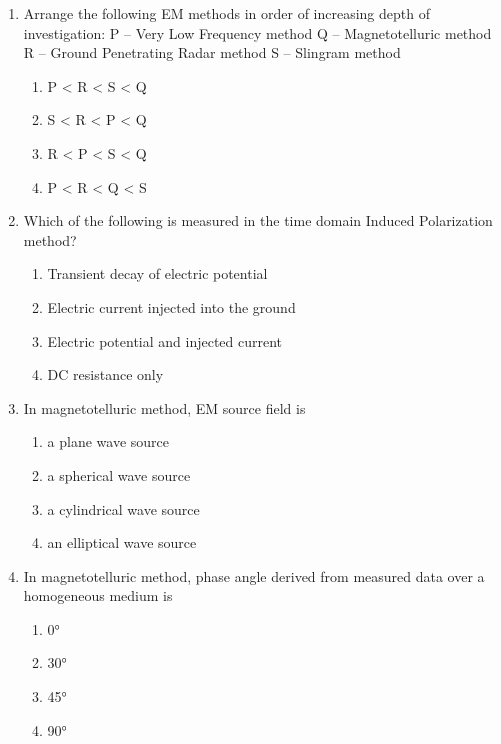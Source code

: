 \documentclass[journal,12pt,onecolumn]{IEEEtran}
\theoremstyle{remark}
\begin{document}
\begin{enumerate}[resume]
\item Arrange the following EM methods in order of increasing depth of investigation:  
P -- Very Low Frequency method  
Q -- Magnetotelluric method  
R -- Ground Penetrating Radar method  
S -- Slingram method

\begin{multicols}{4}
\begin{enumerate}
\item P < R < S < Q  
\item S < R < P < Q  
\item R < P < S < Q  
\item P < R < Q < S  
\end{enumerate}
\end{multicols}
\vspace{0.5cm}

\item Which of the following is measured in the time domain Induced Polarization method?
\begin{enumerate}

\item Transient decay of electric potential  
\item Electric current injected into the ground  
\item Electric potential and injected current  
\item DC resistance only  
\vspace{0.5cm}
\end{enumerate}

\item In magnetotelluric method, EM source field is

\begin{multicols}{2}
\begin{enumerate}
\item a plane wave source  
\item a spherical wave source  
\item a cylindrical wave source  
\item an elliptical wave source  
\end{enumerate}
\end{multicols}
\vspace{0.5cm}

\item In magnetotelluric method, phase angle derived from measured data over a homogeneous medium is

\begin{multicols}{4}
\begin{enumerate}
\item 0°  
\item 30°  
\item 45°  
\item 90°  
\end{enumerate}
\end{multicols}
\vspace{0.5cm}


\end{enumerate}
\end{document}
